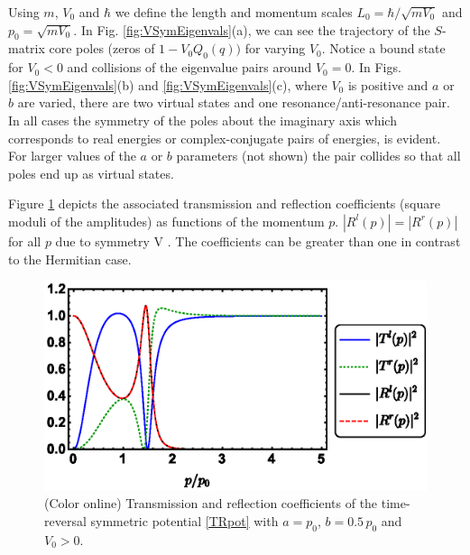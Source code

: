 Using $m$, $V_0$ and $\hbar$ we define the length and momentum scales $L_0 = \hbar/\sqrt{mV_0}$ and $p_0 = \sqrt{mV_0}$. In Fig. \ref{fig:VSymEigenvals}(a), we can see the trajectory of the $S$-matrix core poles (zeros
of $1-V_0Q_0(q))$ for varying $V_0$. Notice a bound state for $V_0<0$ and collisions of the eigenvalue pairs around $V_0 = 0$. In Figs. \ref{fig:VSymEigenvals}(b) and \ref{fig:VSymEigenvals}(c), where $V_0$ is positive and $a$ or $b$ are varied,
there are two virtual states and one resonance/anti-resonance pair. In all cases the symmetry of the poles about the imaginary axis
which corresponds to real energies or complex-conjugate pairs of energies, is evident. For larger values of the $a$ or $b$ parameters
(not shown)
the pair collides so that all poles end up as virtual states.

Figure \ref{fig:VSymScattAmplitudes} depicts the associated transmission and reflection coefficients (square moduli of the amplitudes) as functions of the momentum $p$. $|R^l(p)|=|R^r(p)|$ for all $p$ due to symmetry V \cite{Ruschhaupt2017}.
The coefficients can be greater than one in contrast to the Hermitian case.

\begin{figure}
\begin{center}
	\includegraphics[width=1\linewidth]{Figures/VSymScattAmplitudes.eps}
\end{center}
\caption{(Color online) Transmission and reflection coefficients of the time-reversal symmetric potential \eqref{TRpot} with $a=p_0$, $b= 0.5\, p_0$ and $V_0>0$.}
\label{fig:VSymScattAmplitudes}
\end{figure}

